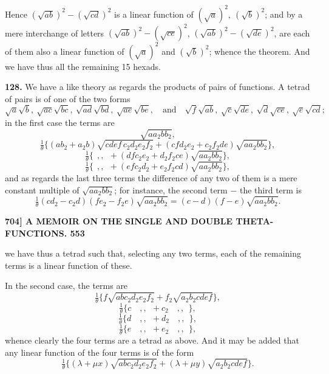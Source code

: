 \documentclass[11pt]{article}
\begin{document}
Hence $(\sqrt{ab})^2 - (\sqrt{cd})^2$ is a linear function of $(\sqrt{a})^2,\ (\sqrt{b})^2$; and by a mere interchange of letters $(\sqrt{ab})^2 - (\sqrt{ce})^2$, $(\sqrt{ab})^2 - (\sqrt{de})^2$, are each of them also a linear function of $(\sqrt{a})^2$ and $(\sqrt{b})^2$; whence the theorem. And we have thus all the remaining 15 hexads.

\medskip
\textbf{128.} We have a like theory as regards the products of pairs of functions. A tetrad of pairs is of one of the two forms
\[
\sqrt{a}\sqrt{b},\ \sqrt{ac}\sqrt{bc},\ \sqrt{ad}\sqrt{bd},\ \sqrt{ae}\sqrt{be},\quad\text{and}\quad \sqrt{f}\sqrt{ab},\ \sqrt{c}\sqrt{de},\ \sqrt{d}\sqrt{ce},\ \sqrt{e}\sqrt{cd};
\]
in the first case the terms are
\[
\sqrt{aa_2bb_2},
\]
\[
\tfrac{1}{\theta}\bigl\{(ab_2 + a_2b)\sqrt{cdef\,c_2d_2e_2f_2} + (cfd_2e_2 + c_2f_2de)\sqrt{aa_2bb_2}\bigr\},
\]
\[
\tfrac{1}{\theta}\bigl\{ \ \ ,, \ \ + (dfc_2e_2 + d_2f_2ce)\sqrt{aa_2bb_2}\bigr\},
\]
\[
\tfrac{1}{\theta}\bigl\{ \ \ ,, \ \ + (efc_2d_2 + e_2f_2cd)\sqrt{aa_2bb_2}\bigr\},
\]
and as regards the last three terms the difference of any two of them is a mere constant multiple of $\sqrt{aa_2bb_2}$; for instance, the second term $-$ the third term is
\[
\tfrac{1}{\theta}(cd_2 - c_2d)(fe_2 - f_2e)\sqrt{aa_2bb_2} = (c - d)(f - e)\sqrt{aa_2bb_2}.
\]

\newpage
\noindent\textbf{704] \quad A MEMOIR ON THE SINGLE AND DOUBLE THETA-FUNCTIONS. \hfill 553}

\medskip
we have thus a tetrad such that, selecting any two terms, each of the remaining terms is a linear function of these.

\medskip
In the second case, the terms are
\[
\tfrac{1}{\theta}\bigl\{f\sqrt{abc_2d_2e_2f_2} + f_2\sqrt{a_2b_2cdef}\bigr\},
\]
\[
\tfrac{1}{\theta}\bigl\{c\quad,, \ \ + c_2\quad,, \ \ \bigr\},
\]
\[
\tfrac{1}{\theta}\bigl\{d\quad,, \ \ + d_2\quad,, \ \ \bigr\},
\]
\[
\tfrac{1}{\theta}\bigl\{e\quad,, \ \ + e_2\quad,, \ \ \bigr\},
\]
whence clearly the four terms are a tetrad as above. And it may be added that any linear function of the four terms is of the form
\[
\tfrac{1}{\theta}\bigl\{(\lambda + \mu x)\sqrt{abc_2d_2e_2f_2} + (\lambda + \mu y)\sqrt{a_2b_2cdef}\bigr\}.
\]
\end{document}
